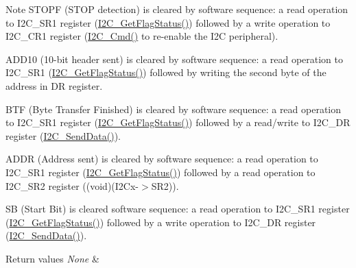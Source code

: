 \begin{DoxyNote}{Note}
S\+T\+O\+PF (S\+T\+OP detection) is cleared by software sequence\+: a read operation to I2\+C\+\_\+\+S\+R1 register (\mbox{\hyperlink{group___i2_c___group5_ga15c95d0ed124f029621a2061b1677ee7}{I2\+C\+\_\+\+Get\+Flag\+Status()}}) followed by a write operation to I2\+C\+\_\+\+C\+R1 register (\mbox{\hyperlink{group___i2_c___group1_ga7e1323c9133c2cb424dfb5b10b7d2f0b}{I2\+C\+\_\+\+Cmd()}} to re-\/enable the I2C peripheral). 

A\+D\+D10 (10-\/bit header sent) is cleared by software sequence\+: a read operation to I2\+C\+\_\+\+S\+R1 (\mbox{\hyperlink{group___i2_c___group5_ga15c95d0ed124f029621a2061b1677ee7}{I2\+C\+\_\+\+Get\+Flag\+Status()}}) followed by writing the second byte of the address in DR register. 

B\+TF (Byte Transfer Finished) is cleared by software sequence\+: a read operation to I2\+C\+\_\+\+S\+R1 register (\mbox{\hyperlink{group___i2_c___group5_ga15c95d0ed124f029621a2061b1677ee7}{I2\+C\+\_\+\+Get\+Flag\+Status()}}) followed by a read/write to I2\+C\+\_\+\+DR register (\mbox{\hyperlink{group___i2_c___group2_ga7bd9e70b8eafde0dd5eb42b0d95fe1a9}{I2\+C\+\_\+\+Send\+Data()}}). 

A\+D\+DR (Address sent) is cleared by software sequence\+: a read operation to I2\+C\+\_\+\+S\+R1 register (\mbox{\hyperlink{group___i2_c___group5_ga15c95d0ed124f029621a2061b1677ee7}{I2\+C\+\_\+\+Get\+Flag\+Status()}}) followed by a read operation to I2\+C\+\_\+\+S\+R2 register ((void)(I2\+Cx-\/$>$S\+R2)). 

SB (Start Bit) is cleared software sequence\+: a read operation to I2\+C\+\_\+\+S\+R1 register (\mbox{\hyperlink{group___i2_c___group5_ga15c95d0ed124f029621a2061b1677ee7}{I2\+C\+\_\+\+Get\+Flag\+Status()}}) followed by a write operation to I2\+C\+\_\+\+DR register (\mbox{\hyperlink{group___i2_c___group2_ga7bd9e70b8eafde0dd5eb42b0d95fe1a9}{I2\+C\+\_\+\+Send\+Data()}}).
\end{DoxyNote}

\begin{DoxyRetVals}{Return values}
{\em None} & \\
\hline
\end{DoxyRetVals}
\mbox{\label{group___i2_c___group5_ga110dda440fa200b5f77349df19b3e6bb}} 
